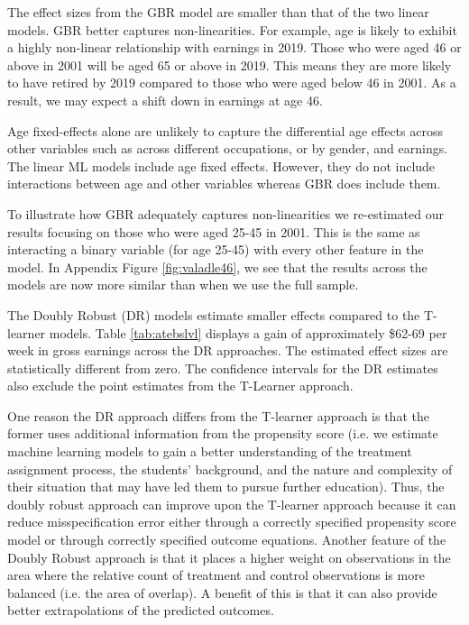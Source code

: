\documentclass[12pt, a4paper]{article}
\begin{document}
The effect sizes from the GBR model are smaller than that of the two linear models. GBR better captures non-linearities. For example, age is likely to exhibit a highly non-linear relationship with earnings in 2019. Those who were aged 46 or above in 2001 will be aged 65 or above in 2019. This means they are more likely to have retired by 2019 compared to those who were aged below 46 in 2001. As a result, we may expect a shift down in earnings at age 46. 

Age fixed-effects alone are unlikely to capture the differential age effects across other variables such as across different occupations, or by gender, and earnings. The linear ML models include age fixed effects. However, they do not include interactions between age and other variables whereas GBR does include them.

To illustrate how GBR adequately captures non-linearities we re-estimated our results focusing on those who were aged 25-45 in 2001. This is the same as interacting a binary variable (for age 25-45) with every other feature in the model. In Appendix Figure \ref{fig:valadle46}, we see that the results across the models are now more similar than when we use the full sample.

The Doubly Robust (DR) models estimate smaller effects compared to the T-learner models. Table \ref{tab:atebslvl} displays a gain of approximately \$62-69 per week in gross earnings across the DR approaches. The estimated effect sizes are statistically different from zero. The confidence intervals for the DR estimates also exclude the point estimates from the T-Learner approach.

One reason the DR approach differs from the T-learner approach is that the
former uses additional information from the propensity score (i.e. we estimate
machine learning models to gain a better understanding of the treatment
assignment process, the students’ background, and the nature and complexity of
their situation that may have led them to pursue further education). Thus, the
doubly robust approach can improve upon the T-learner approach because it can
reduce misspecification error either through a correctly specified propensity
score model or through correctly specified outcome equations. Another feature
of the Doubly Robust approach is that it places a higher weight on observations
in the area where the relative count of treatment and control observations is
more balanced (i.e. the area of overlap). A benefit of this is that it can also
provide better extrapolations of the predicted outcomes. 
\end{document}
